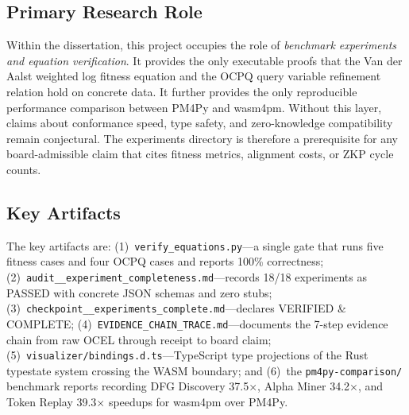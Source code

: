 \subsection{Primary Research Role}
\label{sec:experiments-core-identity-role}

Within the dissertation, this project occupies the role of \emph{benchmark experiments
and equation verification}. It provides the only executable proofs that the Van der Aalst
weighted log fitness equation and the OCPQ query variable refinement relation hold on
concrete data. It further provides the only reproducible performance comparison between
PM4Py and wasm4pm. Without this layer, claims about conformance speed, type safety, and
zero-knowledge compatibility remain conjectural. The experiments directory is therefore
a prerequisite for any board-admissible claim that cites fitness metrics, alignment costs,
or ZKP cycle counts.

\subsection{Key Artifacts}
\label{sec:experiments-core-identity-artifacts}

The key artifacts are: (1)~\texttt{verify\_equations.py}---a single gate that runs
five fitness cases and four OCPQ cases and reports 100\% correctness; (2)~\texttt{audit\_\_experiment\_completeness.md}---records 18/18 experiments as PASSED with concrete JSON schemas and zero stubs;
(3)~\texttt{checkpoint\_\_experiments\_complete.md}---declares VERIFIED \& COMPLETE;
(4)~\texttt{EVIDENCE\_CHAIN\_TRACE.md}---documents the 7-step evidence chain from raw OCEL
through receipt to board claim; (5)~\texttt{visualizer/bindings.d.ts}---TypeScript type
projections of the Rust typestate system crossing the WASM boundary; and (6)~the
\texttt{pm4py-comparison/} benchmark reports recording DFG Discovery 37.5$\times$,
Alpha Miner 34.2$\times$, and Token Replay 39.3$\times$ speedups for wasm4pm over PM4Py.
